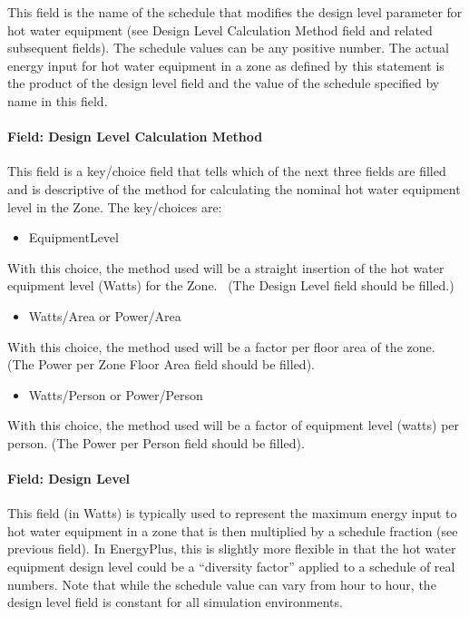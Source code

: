 This field is the name of the schedule that modifies the design level parameter for hot water equipment (see Design Level Calculation Method field and related subsequent fields). The schedule values can be any positive number. The actual energy input for hot water equipment in a zone as defined by this statement is the product of the design level field and the value of the schedule specified by name in this field.

\paragraph{Field: Design Level Calculation Method}\label{field-design-level-calculation-method-3}

This field is a key/choice field that tells which of the next three fields are filled and is descriptive of the method for calculating the nominal hot water equipment level in the Zone. The key/choices are:

\begin{itemize}
\tightlist
\item
  EquipmentLevel
\end{itemize}

With this choice, the method used will be a straight insertion of the hot water equipment level (Watts) for the Zone.~ (The Design Level field should be filled.)

\begin{itemize}
\tightlist
\item
  Watts/Area or Power/Area
\end{itemize}

With this choice, the method used will be a factor per floor area of the zone. (The Power per Zone Floor Area field should be filled).

\begin{itemize}
\tightlist
\item
  Watts/Person or Power/Person
\end{itemize}

With this choice, the method used will be a factor of equipment level (watts) per person. (The Power per Person field should be filled).

\paragraph{Field: Design Level}\label{field-design-level-2-000}

This field (in Watts) is typically used to represent the maximum energy input to hot water equipment in a zone that is then multiplied by a schedule fraction (see previous field). In EnergyPlus, this is slightly more flexible in that the hot water equipment design level could be a ``diversity factor'' applied to a schedule of real numbers. Note that while the schedule value can vary from hour to hour, the design level field is constant for all simulation environments.

